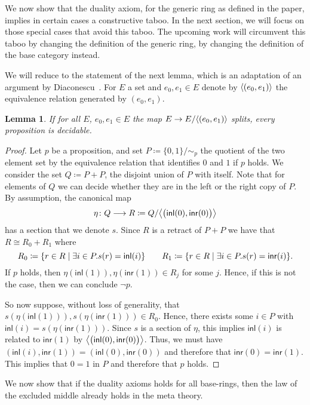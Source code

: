 \documentclass[10pt,a4paper]{article}
\newtheorem{lemma}{Lemma}[section]
\newcommand\inl{\mathsf{inl}}
\newcommand\inr{\mathsf{inr}}
\DeclarePairedDelimiter\gen{\langle}{\rangle}
\DeclarePairedDelimiter\paren{(}{)}
\DeclarePairedDelimiter\set{\{}{\}}
\begin{document}
We now show that the duality axiom, for the generic ring as defined in the paper, implies in certain cases a constructive taboo.
In the next section, we will focus on those special cases that avoid this taboo.
The upcoming work will circumvent this taboo by changing the definition of the generic ring, by changing the definition of the base category instead.

We will reduce to the statement of the next lemma, which is an adaptation of an argument by Diaconescu~\cite{diaconescu1975choice}.
For $E$ a set and $e_0, e_1 \in E$ denote by $\gen{(e_0, e_1)}$ the equivalence relation generated by $(e_0, e_1)$.

\begin{lemma}\label{prop:coequalizers-of-disjoint-subobjects-with-terminal-doamin-split-implies-lem}
  If for all $E$, $e_0, e_1 \in E$ the map $E \to E/\gen{(e_0, e _1)}$ splits, every proposition is decidable.
\end{lemma}
\begin{proof}
  Let $p$ be a proposition, and set $P \coloneqq \{ 0, 1 \} / \sim_p$ the quotient of the two element set by the equivalence relation that identifies $0$ and $1$ if $p$ holds.
  We consider the set $Q \coloneqq P + P$, the disjoint union of $P$ with itself.
  Note that for elements of $Q$ we can decide whether they are in the left or the right copy of $P$.
  By assumption, the canonical map
  \[
    \eta \colon Q \longrightarrow R \coloneqq Q / \gen[\big]{\paren[\big]{ \inl(0), \inr(0) }}
  \]
  has a section that we denote $s$.
  Since $R$ is a retract of $P + P$ we have that $R \cong R_0 + R_1$ where
  \[
    R_0 \coloneqq \set{ r \in R \mid \exists i \in P. s(r) = \inl(i) } \qquad
    R_1 \coloneqq \set{ r \in R \mid \exists i \in P. s(r) = \inr(i) }.
  \]
  If $p$ holds, then $\eta(\inl(1)), \eta(\inr(1)) \in R_j$ for some $j$.
  Hence, if this is not the case, then we can conclude $\neg p$.

  So now suppose, without loss of generality, that $s(\eta(\inl(1))), s(\eta(\inr(1))) \in R_0$.
  Hence, there exists some $i \in P$ with $\inl(i) = s(\eta(\inr(1)))$.
  Since $s$ is a section of $\eta$, this implies $\inl(i)$ is related to $\inr(1)$ by $\gen[\big]{\paren[\big]{ \inl(0), \inr(0) }}$.
  Thus, we must have $(\inl(i), \inr(1)) = (\inl(0), \inr(0))$ and therefore that $\inr(0) = \inr(1)$.
  This implies that $0 = 1$ in $P$ and therefore that $p$ holds.
\end{proof}

We now show that if the duality axioms holds for all base-rings, then the law of the excluded middle already holds in the meta theory.
\end{document}

